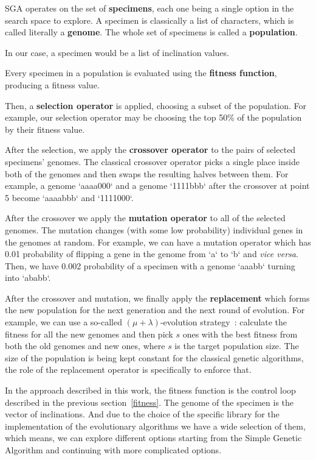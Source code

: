 \documentclass[12pt, a4paper]{report}
\begin{document}
  SGA operates on the set of \textbf{specimens}, each one being a single option in the search space to explore.
  A specimen is classically a list of characters, which is called literally a \textbf{genome}.
  The whole set of specimens is called a \textbf{population}.

  In our case, a specimen would be a list of inclination values.

  Every specimen in a population is evaluated using the \textbf{fitness function}, producing a fitness value.

  Then, a \textbf{selection operator} is applied, choosing a subset of the population.
  For example, our selection operator may be choosing the top 50\% of the population by their fitness value.

  After the selection, we apply the \textbf{crossover operator} to the pairs of selected specimens' genomes.
  The classical crossover operator picks a single place inside both of the genomes and then swaps the resulting halves between them.
  For example, a genome `aaaa000` and a genome `1111bbb` after the crossover at point 5 become `aaaabbb` and `1111000`.

  After the crossover we apply the \textbf{mutation operator} to all of the selected genomes.
  The mutation changes (with some low probability) individual genes in the genomes at random.
  For example, we can have a mutation operator which has 0.01 probability of flipping a gene in the genome from `a` to `b` and \textit{vice versa}.
  Then, we have 0.002 probability of a specimen with a genome `aaabb` turning into `ababb`.

  After the crossover and mutation, we finally apply the \textbf{replacement} which forms the new population for the next generation and the next round of evolution.
  For example, we can use a so-called $\left(\mu + \lambda\right)$-evolution strategy~\cite{schwefel1981numerical}: calculate the fitness for all the new genomes and then pick $s$ ones with the best fitness from both the old genomes and new ones, where $s$ is the target population size.
  The size of the population is being kept constant for the classical genetic algorithms, the role of the replacement operator is specifically to enforce that.

  In the approach described in this work, the fitness function is the control loop described in the previous section~\ref{fitness}.
  The genome of the specimen is the vector of inclinations.
	And due to the choice of the specific library for the implementation of the evolutionary algorithms we have a wide selection of them,
  which means, we can explore different options starting from the Simple Genetic Algorithm and continuing with more complicated options.
\end{document}
